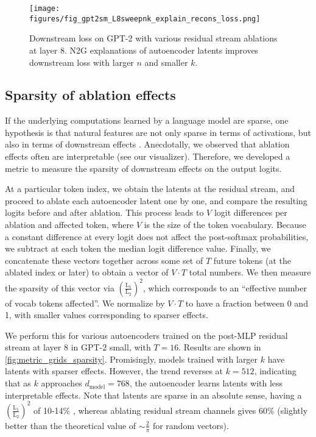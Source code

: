 \begin{figure}[h]
    \centering
    \texttt{[image: figures/fig\_gpt2sm\_L8sweepnk\_explain\_recons\_loss.png]}
    \caption{Downstream loss on GPT-2 with various residual stream ablations at layer 8.  N2G explanations of autoencoder latents improves downstream loss with larger $n$ and smaller $k$.}
    \label{fig:explain-recons}
\end{figure}




\subsection{Sparsity of ablation effects}
\label{sec:effects-sparsity}

If the underlying computations learned by a language model are sparse,
one hypothesis is that natural features are not only sparse in terms of activations,
but also in terms of downstream effects \citep{olah2024open}.  Anecdotally, we observed that ablation effects often are interpretable (see our visualizer). 
Therefore, we developed a metric to measure the sparsity of downstream effects on the output logits.

At a particular token index, we obtain the latents at the residual stream, and proceed to ablate each autoencoder latent one by one, and compare the resulting logits before and after ablation. This process leads to $V$ logit differences per ablation and affected token, where $V$ is the size of the token vocabulary.  
Because a constant difference at every logit does not affect the post-softmax probabilities,
we subtract at each token the median logit difference value.  Finally, we concatenate these vectors together across some set of $T$ future tokens (at the ablated index or later) to obtain a vector of $V \cdot T$ total numbers.
We then measure the sparsity of this vector via $(\frac{\text{L}_1}{\text{L}_2})^2$,
which corresponds to an ``effective number of vocab tokens affected''. %
We normalize by $V \cdot T$ to have a fraction between 0 and 1, with smaller values corresponding to sparser effects.  

We perform this for various autoencoders trained on the post-MLP residual stream at layer 8 in GPT-2 small, with $T=16$. Results are shown in \autoref{fig:metric_grids_sparsity}.  Promisingly, models trained with larger $k$ have latents with sparser effects.  However, the trend reverses at $k=512$, indicating that as $k$ approaches $d_{\text{model}} = 768$, the autoencoder learns latents with less interpretable effects.  
Note that latents are sparse in an absolute sense, having a $(\frac{\text{L}_1}{\text{L}_2})^2$ of 10-14\% 
, whereas ablating residual stream channels gives 60\%
 (slightly better than the theoretical value of $\sim\frac{2}{\pi}$ for random vectors).
















